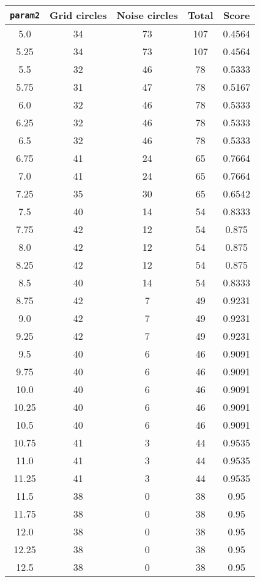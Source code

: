 \documentclass[letterpaper, 12pt]{article}
\begin{document}
\begin{longtable}{|c|c|c|c|c|}
\hline
\textbf{\texttt{param2}} & \textbf{Grid circles} & \textbf{Noise circles} & \textbf{Total} & \textbf{Score} \\
\hline
5.0 & 34 & 73 & 107 & 0.4564 \\
\hline
5.25 & 34 & 73 & 107 & 0.4564 \\
\hline
5.5 & 32 & 46 & 78 & 0.5333 \\
\hline
5.75 & 31 & 47 & 78 & 0.5167 \\
\hline
6.0 & 32 & 46 & 78 & 0.5333 \\
\hline
6.25 & 32 & 46 & 78 & 0.5333 \\
\hline
6.5 & 32 & 46 & 78 & 0.5333 \\
\hline
6.75 & 41 & 24 & 65 & 0.7664 \\
\hline
7.0 & 41 & 24 & 65 & 0.7664 \\
\hline
7.25 & 35 & 30 & 65 & 0.6542 \\
\hline
7.5 & 40 & 14 & 54 & 0.8333 \\
\hline
7.75 & 42 & 12 & 54 & 0.875 \\
\hline
8.0 & 42 & 12 & 54 & 0.875 \\
\hline
8.25 & 42 & 12 & 54 & 0.875 \\
\hline
8.5 & 40 & 14 & 54 & 0.8333 \\
\hline
8.75 & 42 & 7 & 49 & 0.9231 \\
\hline
9.0 & 42 & 7 & 49 & 0.9231 \\
\hline
9.25 & 42 & 7 & 49 & 0.9231 \\
\hline
9.5 & 40 & 6 & 46 & 0.9091 \\
\hline
9.75 & 40 & 6 & 46 & 0.9091 \\
\hline
10.0 & 40 & 6 & 46 & 0.9091 \\
\hline
10.25 & 40 & 6 & 46 & 0.9091 \\
\hline
10.5 & 40 & 6 & 46 & 0.9091 \\
\hline
10.75 & 41 & 3 & 44 & 0.9535 \\
\hline
11.0 & 41 & 3 & 44 & 0.9535 \\
\hline
11.25 & 41 & 3 & 44 & 0.9535 \\
\hline
11.5 & 38 & 0 & 38 & 0.95 \\
\hline
11.75 & 38 & 0 & 38 & 0.95 \\
\hline
12.0 & 38 & 0 & 38 & 0.95 \\
\hline
12.25 & 38 & 0 & 38 & 0.95 \\
\hline
12.5 & 38 & 0 & 38 & 0.95 \\

\end{longtable}
\end{document}
